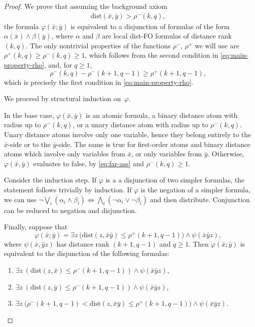 \documentclass[11pt]{article}
\theoremstyle{remark}
\def\phi{\varphi}
\renewcommand{\le}{\leqslant}
\renewcommand{\ge}{\geqslant}
\newcommand{\dist}{\mathrm{dist}}
\newcommand{\distFO}{\textrm{\upshape dist-FO}\xspace}
\newcommand{\tup}{\bar}
\begin{document}
\begin{proof}
 We prove that assuming the background axiom
 \begin{align}\label{eq:far-ass}
\dist(\tup x,\tup y)>\rho^-(k,q),
 \end{align}
 the formula
 $\phi(\tup x;\tup y)$
is equivalent to a disjunction of
formulas of the form $\alpha(\tup x)\land \beta(\tup y)$, where
$\alpha$ and $\beta$ are local \distFO formulas of distance rank $(k,q)$.
The only nontrivial properties of the functions \(\rho^-\), \(\rho^+\) we will use are
\(\rho^+(k,q)\ge \rho^-(k,q)\ge 1\), which follows from the second condition in
\eqref{eq:main-property-rho}, and, for $q\ge 1$,
\begin{equation}\label{eq:prop-of-rho}
    \rho^-(k,q)-\rho^-(k+1,q-1) \ge \rho^+(k+1,q-1),
\end{equation}
which is precisely the first condition in \eqref{eq:main-property-rho}.


We proceed by structural induction on~$\phi$.

In the base case, $\phi(\bar x,\bar y)$
is an atomic formula, a binary distance atom with radius up to $\rho^-(k,q)$, or a unary distance atom with radius up to $\rho^-(k,q)$.
Unary distance atoms involve only one variable, hence they belong entirely to the $\tup x$-side or to the $\tup y$-side.
The same is true for first-order atoms and binary distance atoms which involve only variables from $\tup x$, or only variables from $\tup y$.
Otherwise, $\phi(\bar x,\bar y)$ evaluates to false, by \eqref{eq:far-ass} and $\rho^-(k,q)\ge 1$.

\newcommand{\far}{\mathrm{far}}
\newcommand{\near}{\mathrm{near}}
Consider the induction step. If $\phi$ is a a disjunction of two simpler formulas, the statement follows trivially by induction.
If $\phi$ is the negation of a simpler formula, we can use
$\neg\bigvee_{i}(\alpha_i\land \beta_i) \iff  \bigwedge_i(\neg\alpha_i\lor\neg\beta_i)$ and then distribute. Conjunction can be reduced to negation and disjunction.

Finally, suppose that
$$\phi(\tup x;\tup y)=\exists z~\Big(\dist(z,\tup x\tup y)\le \rho^+(k+1,q-1)\Big)\land \psi(\tup x \tup y z),$$
where $\psi(\tup x,\tup y z)$
has distance rank $(k+1,q-1)$ and $q\ge 1$.
Then
$\phi(\tup x;\tup y)$ is equivalent  to the disjunction of  the following formulas:
\begin{enumerate}
    \item
 $\exists z~ (\dist(z,\tup x)\le \rho^-(k+1,q-1))\land   \psi(\tup x \tup y z)$,
 \item
 $\exists z~(\dist(z,\tup y)\le \rho^-(k+1,q-1))\land \psi(\tup x \tup y z)$,
 \item
 $\exists z~\Big(\rho^-(k+1,q-1)< \dist(z,\tup x \tup y)\le\rho^+(k+1,q-1)\Big)\land \psi(\tup x \tup y z)$.
\end{enumerate}




\end{proof}
\end{document}
